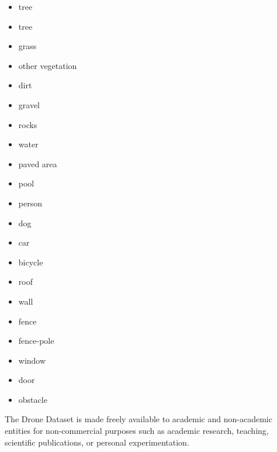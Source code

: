 \begin{itemize}
  \item tree
  \item tree
  \item grass
  \item other vegetation
  \item dirt
  \item gravel
  \item rocks
  \item water
  \item paved area
  \item pool
  \item person
  \item dog
  \item car
  \item bicycle
  \item roof
  \item wall
  \item fence
  \item fence-pole
  \item window
  \item door
  \item obstacle
  
\end{itemize}
The Drone Dataset is made freely available to academic and non-academic entities for non-commercial purposes such as academic research, teaching, scientific publications, or personal experimentation.
